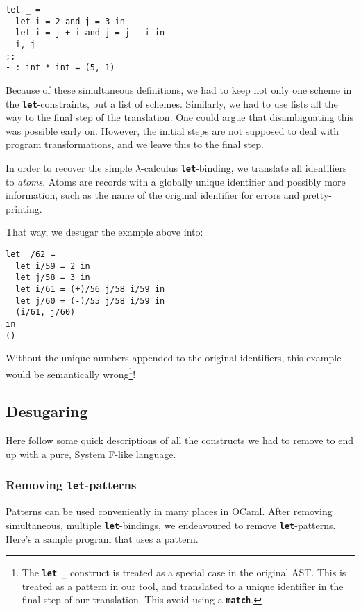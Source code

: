 \documentclass[10pt,a4paper,twoside,titlepage,twocolumn]{article}
\newcommand{\code}[1]{\textbf{\texttt{#1}}}
\begin{document}
\begin{verbatim}
let _ =
  let i = 2 and j = 3 in
  let i = j + i and j = j - i in
  i, j
;;
- : int * int = (5, 1)
\end{verbatim}

Because of these simultaneous definitions, we had to keep not only one scheme in
the \code{let}-constraints, but a list of schemes. Similarly, we had to use
lists all the way to the final step of the translation. One could argue that
disambiguating this was possible early on. However, the initial steps are not
supposed to deal with program transformations, and we leave this to the final
step.

In order to recover the simple $\lambda$-calculus \code{let}-binding, we
translate all identifiers to \emph{atoms}. Atoms are records with a globally
unique identifier and possibly more information, such as the name of the
original identifier for errors and pretty-printing.

That way, we desugar the example above into:

\begin{verbatim}
let _/62 =
  let i/59 = 2 in
  let j/58 = 3 in
  let i/61 = (+)/56 j/58 i/59 in
  let j/60 = (-)/55 j/58 i/59 in
  (i/61, j/60)
in
()
\end{verbatim}

Without the unique numbers appended to the original identifiers, this example
would be semantically wrong\footnote{The \code{let \_} construct is treated as a
special case in the original AST. This is treated as a pattern in our tool, and
translated to a unique identifier in the final step of our translation. This
avoid using a \code{match}.}!

\subsection{Desugaring}

Here follow some quick descriptions of all the constructs we had to remove to
end up with a pure, System F-like language.

\subsubsection{Removing \code{let}-patterns}

Patterns can be used conveniently in many places in OCaml. After removing
simultaneous, multiple \code{let}-bindings, we endeavoured to remove
\code{let}-patterns. Here's a sample program that uses a pattern.
\end{document}
